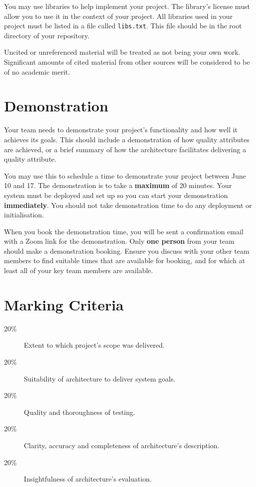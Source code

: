 \documentclass{csse4400}
\begin{document}
You may use libraries to help implement your project.
The library's license must allow you to use it in the context of your project.
All libraries used in your project must be listed in a file called \texttt{libs.txt}.
This file should be in the root directory of your repository.

Uncited or unreferenced material will be treated as not being your own work.
Significant amounts of cited material from other sources will be considered to be of no academic merit.


\section{Demonstration}
Your team needs to demonstrate your project's functionality and how well it achieves its goals.
This should include a demonstration of how quality attributes are achieved,
or a brief summary of how the architecture facilitates delivering a quality attribute.

You may use this 
to schedule a time to demonstrate your project between June 10 and 17.
The demonstration is to take a \textbf{maximum} of 20 minutes.
Your system must be deployed and set up so you can start your demonstration \textbf{immediately}.
You should not take demonstration time to do any deployment or initialisation.

When you book the demonstration time, you will be sent a confirmation email with a Zoom link for the demonstration.
Only \textbf{one person} from your team should make a demonstration booking.
Ensure you discuss with your other team members to find suitable times that are available for booking,
and for which at least all of your key team members are available.


\section{Marking Criteria}

\begin{description}
    \item[20\%] Extent to which project's scope was delivered.
    \item[20\%] Suitability of architecture to deliver system goals.
    \item[20\%] Quality and thoroughness of testing.
    \item[20\%] Clarity, accuracy and completeness of architecture's description.
    \item[20\%] Insightfulness of architecture's evaluation.
\end{description}
\end{document}
